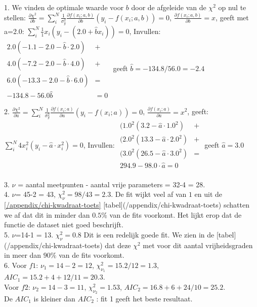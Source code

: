 1. We vinden de optimale waarde voor $b$ door de afgeleide van de $\chi^2$ op nul te stellen: ${\frac{\partial \chi^2}{\partial b} = \sum_i^N \frac{1}{\sigma_y^2} \frac{\partial f(x_i;a,b)}{\partial b} \left(y_i - f(x_i;a,b)\right) = 0 }$,
$\frac{\partial f(x_i;a,b)}{\partial b} = x$, 
geeft met a=2.0: 
${\sum_i^N \frac{1}{1} x_i(y_i - (2.0 + \hat{b} x_i )) = 0}$, 
Invullen: 
$\begin{aligned}
2.0 \left( -1.1 -  2.0 - \hat{b} \cdot 2.0\right) & +  \\
4.0 \left( -7.2 - 2.0 - \hat{b} \cdot 4.0 \right) & + \\
6.0 \left( -13.3 - 2.0 - \hat{b} \cdot 6.0 \right) & = \\
- 134.8 - 56.0 \hat{b} & = 0
\end{aligned}$
geeft $ \hat{b} = - 134.8/56.0  = - 2.4 $


2. ${\frac{\partial \chi^2}{\partial a} = \sum_i^N \frac{1}{\sigma_y^2} \frac{\partial f(x_i;a)}{\partial a} \left(y_i - f(x_i;a)\right) = 0 }$,
$\frac{\partial f(x_i;a)}{\partial a} = x^2$,
geeft:
${\sum_i^N {4} x^2_i \left( y_i - \hat{a} \cdot x_i^2 \right) = 0}$,
Invullen:
$\begin{aligned}
(1.0^2 \left( 3.2 - \hat{a} \cdot 1.0^2 \right) & +  \\
(2.0^2 \left( 13.3 - \hat{a} \cdot 2.0^2 \right) & + \\
(3.0^2 \left( 26.5 - \hat{a} \cdot 3.0^2 \right) & = \\
294.9 - 98.0 \cdot \hat{a} = 0 \\
\end{aligned}$
geeft $\hat{a} = 3.0$


3. $\nu$ = aantal meetpunten - aantal vrije parameters = 32-4 = 28.\\


4. $\nu$= 45-2 = 43, $\chi^2_\nu = 98/43 =2.3$. De fit wijkt veel af van $1$ en uit de \ref{/appendix/chi-kwadraat-toets} [tabel](/appendix/chi-kwadraat-toets) schatten we af dat dit in minder dan $0.5\%$ van de fits voorkomt. Het lijkt erop dat de functie de dataset niet goed beschrijft.\\


5. $\nu$=14-1 = 13. $\chi^2_\nu = 0.8$ Dit is een redelijk goede fit. We zien in de [tabel](/appendix/chi-kwadraat-toets) dat deze $\chi^2$ met voor dit aantal vrijheidsgraden in meer dan $90\%$ van de fits voorkomt.\\


6. Voor $f1$: $\nu_1 = 14-2 = 12$, $\chi^2_{\nu_1} = 15.2/12 = 1.3$, $AIC_1 = 15.2 + 4 + 12/11 = 20.3$.\\
Voor $f2$: $\nu_2 = 14 -3 = 11$, $\chi^2_{\nu_2} = 1.53 $, $AIC_2 = 16.8 + 6 + 24/10 = 25.2$.\\
De $AIC_1$ is kleiner dan $AIC_2$ : fit 1 geeft het beste resultaat.\\


